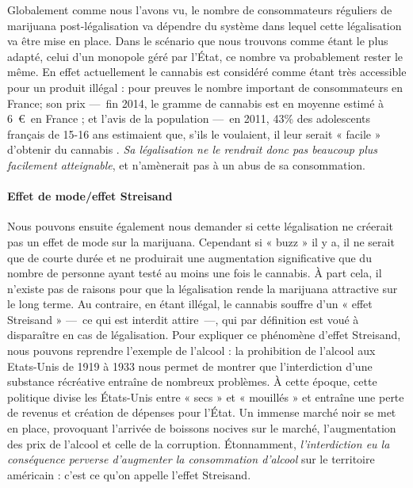     Globalement comme nous l’avons vu, le nombre de consommateurs réguliers de marijuana post-légalisation va dépendre du système dans lequel cette légalisation va être mise en place. Dans le scénario que nous trouvons comme étant le plus adapté, celui d’un monopole géré par l’État, ce nombre va probablement rester le même. En effet actuellement le cannabis est considéré comme étant très accessible pour un produit illégal : pour preuves le nombre important de consommateurs en France; son prix ---~fin 2014, le gramme de cannabis est en moyenne estimé à 6~\euro\ en France \cite{terraNova_rapport}; et l’avis de la population ---~en 2011, 43\% des adolescents français de 15-16 ans estimaient que, s’ils le voulaient, il leur serait « facile » d’obtenir du cannabis \cite{obradovic15}. \textit{Sa légalisation ne le rendrait donc pas beaucoup plus facilement atteignable}, et n’amènerait pas à un abus de sa consommation. 

\paragraph{Effet de mode/effet Streisand}

Nous pouvons ensuite également nous demander si cette légalisation ne créerait pas un effet de mode sur la marijuana. Cependant si « buzz » il y a, il ne serait que de courte durée et ne produirait une augmentation significative que du nombre de personne ayant testé au moins une fois le cannabis. À part cela, il n’existe pas de raisons pour que la légalisation rende la marijuana attractive sur le long terme. Au contraire, en étant illégal, le cannabis souffre d’un « effet Streisand » ---~ce qui est interdit attire~---, qui par définition est voué à disparaître en cas de légalisation. Pour expliquer ce phénomène d’effet Streisand, nous pouvons reprendre l’exemple de l’alcool : la prohibition de l’alcool aux Etats-Unis de 1919 à 1933 nous permet de montrer que l’interdiction d’une substance récréative entraîne de nombreux problèmes. À cette époque, cette politique divise les États-Unis entre « secs » et « mouillés » et entraîne une perte de revenus et création de dépenses pour l’État. Un immense marché noir se met en place,  provoquant l'arrivée de boissons nocives sur le marché, l'augmentation des prix de l’alcool et celle de la corruption. Étonnamment, \textit{l’interdiction eu la conséquence perverse d’augmenter la consommation d’alcool} sur le territoire américain \cite{prohibition20} : c'est ce qu'on appelle l'effet Streisand.

